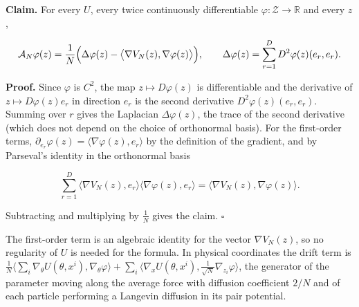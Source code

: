 \documentclass[11pt,a4paper]{report}
\begin{document}
\textbf{Claim.} For every \(U\), every twice continuously differentiable \(\varphi:\mathcal Z\to\mathbb R\) and every \(z\),


\[\mathcal A_N\varphi(z)=\frac1N\Bigl(\Delta\varphi(z)-\bigl\langle\nabla V_N(z),\nabla\varphi(z)\bigr\rangle\Bigr),\qquad\Delta\varphi(z)=\sum_{r=1}^DD^2\varphi(z)(e_r,e_r).\]


\textbf{Proof.} Since \(\varphi\) is \(C^2\), the map \(z\mapsto D\varphi(z)\) is differentiable and the derivative of \(z\mapsto D\varphi(z)e_r\) in direction \(e_r\) is the second derivative \(D^2\varphi(z)(e_r,e_r)\). Summing over \(r\) gives the Laplacian \(\Delta\varphi(z)\), the trace of the second derivative (which does not depend on the choice of orthonormal basis). For the first-order terms, \(\partial_{e_r}\varphi(z)=\langle\nabla\varphi(z),e_r\rangle\) by the definition of the gradient, and by Parseval's identity in the orthonormal basis


\[\sum_{r=1}^D\langle\nabla V_N(z),e_r\rangle\langle\nabla\varphi(z),e_r\rangle=\langle\nabla V_N(z),\nabla\varphi(z)\rangle .\]


Subtracting and multiplying by \(\frac1N\) gives the claim. \(\square\)




The first-order term is an algebraic identity for the vector \(\nabla V_N(z)\), so no regularity of \(U\) is needed for the formula. In physical coordinates the drift term is \(\frac1N\langle\sum_i\nabla_\theta U(\theta,x^i),\nabla_\theta\varphi\rangle+\sum_i\langle\nabla_xU(\theta,x^i),\frac1{\sqrt N}\nabla_{z_i}\varphi\rangle\), the generator of the parameter moving along the average force with diffusion coefficient \(2/N\) and of each particle performing a Langevin diffusion in its pair potential.
\end{document}
